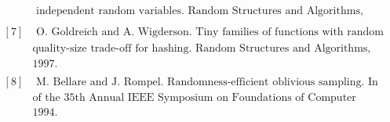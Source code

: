 \documentclass[a4paper, english]{paper}
\begin{document}
\begin{align*}
	&\text{ independent random variables. Random Structures and Algorithms, 3(3):289–304, 1992.}\\
&\\
	[7]&\text{ O. Goldreich and A. Wigderson. Tiny families of functions with random properties: A}\\
	&\text{quality-size trade-off for hashing. Random Structures and Algorithms, 11(4):315–343,}\\
	&\text{1997.}\\
&\\
	[8]&\text{ M. Bellare and J. Rompel. Randomness-efficient oblivious sampling. In Proceedings} \\
	&\text{of the 35th Annual IEEE Symposium on Foundations of Computer Science, pages 276–287,}\\
	&\text{1994.}
\end{align*}
\end{document}
